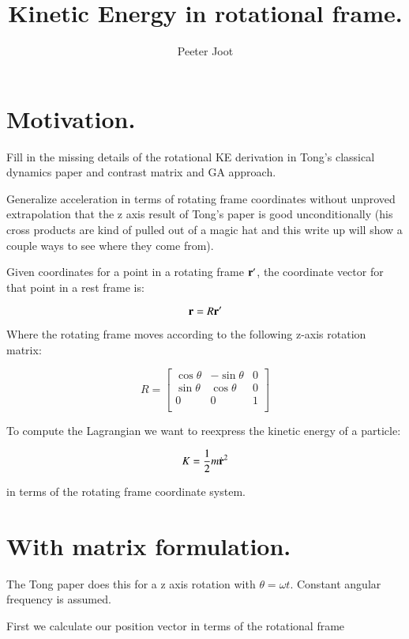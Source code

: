\documentclass{article}      %
\title{ Kinetic Energy in rotational frame. } %
\author{Peeter Joot}         %
\newcommand{\dt}[1]{\dot{#1}}
\begin{document}

\maketitle{}

\section{ Motivation. }

Fill in the missing details of the rotational KE derivation in Tong's classical
dynamics paper and contrast matrix and GA approach.

Generalize acceleration in terms
of rotating frame coordinates without unproved extrapolation that the z axis result
of Tong's paper is good unconditionally (his cross products are kind of pulled out of
a magic hat and this write up will show a couple ways to see where they come from).

Given coordinates for a point in a rotating frame $\mathbf{r}'$, the coordinate vector for that point
in a rest frame is:

\begin{equation}\label{eqn:rotcoord}
\mathbf{r} = R \mathbf{r}'
\end{equation}

Where the rotating frame moves according to the following z-axis rotation matrix:

\[
R = 
\begin{bmatrix}
\cos \theta & -\sin \theta & 0 \\
\sin \theta & \cos \theta & 0 \\
0 & 0 & 1 \\
\end{bmatrix}
\]

To compute the Lagrangian we want to reexpress the 
kinetic energy of a particle:

\[
K = 
\inv{2} m \dt{\Br}^2
\]

in terms of the rotating frame coordinate system.

\section{ With matrix formulation. }

The Tong paper does this for a z axis rotation with $\theta = \omega t$.
Constant angular frequency is assumed.

First we calculate our position vector in terms of the rotational frame
\end{document}
